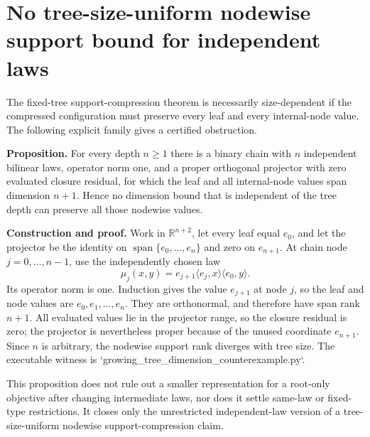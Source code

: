 \section*{No tree-size-uniform nodewise support bound for independent laws}
\label{sec:growing-tree-dimension-obstruction}

The fixed-tree support-compression theorem is necessarily size-dependent if
the compressed configuration must preserve every leaf and every internal-node
value.  The following explicit family gives a certified obstruction.

\textbf{Proposition.} For every depth $n\ge 1$ there is a binary chain with
$n$ independent bilinear laws, operator norm one, and a proper orthogonal
projector with zero evaluated closure residual, for which the leaf and all
internal-node values span dimension $n+1$.  Hence no dimension bound that is
independent of the tree depth can preserve all those nodewise values.

\textbf{Construction and proof.} Work in $\mathbb R^{n+2}$, let every leaf
equal $e_0$, and let the projector be the identity on
$\operatorname{span}\{e_0,\ldots,e_n\}$ and zero on $e_{n+1}$.  At chain node
$j=0,\ldots,n-1$, use the independently chosen law
\[
  \mu_j(x,y)=e_{j+1}\langle e_j,x\rangle\langle e_0,y\rangle.
\]
Its operator norm is one.  Induction gives the value $e_{j+1}$ at node $j$,
so the leaf and node values are $e_0,e_1,\ldots,e_n$.  They are orthonormal,
and therefore have span rank $n+1$.  All evaluated values lie in the projector
range, so the closure residual is zero; the projector is nevertheless proper
because of the unused coordinate $e_{n+1}$.  Since $n$ is arbitrary, the
nodewise support rank diverges with tree size.  The executable witness is
`growing_tree_dimension_counterexample.py`.

This proposition does not rule out a smaller representation for a root-only
objective after changing intermediate laws, nor does it settle same-law or
fixed-type restrictions.  It closes only the unrestricted independent-law
version of a tree-size-uniform nodewise support-compression claim.
